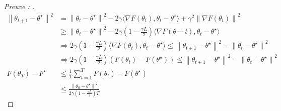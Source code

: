 \begin{proof}[Preuve : ]
    \begin{align*}
        \left\| \theta _{t+1} - \theta ^\star  \right\| ^2 
            &= \left\| \theta _t - \theta ^\star  \right\| ^2 - 2 \gamma  \langle \nabla F(\theta _t), \theta _t - \theta ^\star \rangle + \gamma  ^2 \left\| \nabla F(\theta _t) \right\| ^2 \\
            &\geq  \left\| \theta _t - \theta ^\star  \right\| ^2 - 2 \gamma ( 1 - \frac{\gamma L }{2}) \langle \nabla F(\theta -t) , \theta _t - \theta ^\star \rangle  \\
            &\Rightarrow 2 \gamma (1 - \frac{\gamma L}{2}) \langle \nabla F(\theta _t) , \theta _t - \theta ^\star \rangle \leq  \left\| \theta _{t+1} - \theta ^\star  \right\| ^2 - \left\| \theta _t - \theta ^\star  \right\| ^2  \\
            &\Rightarrow 2 \gamma (1 - \frac{\gamma L }{2}) (F(\theta _t) - F(\theta ^\star )) \leq  \left\| \theta _{t+1} - \theta ^\star  \right\| ^2 - \left\| \theta _t - \theta ^\star  \right\| ^2  \\
        F(\theta _T) - F^\star 
            &\leq \frac{1}{T}\sum_{t=1}^{T} F(\theta _t) - F(\theta ^\star ) \\
            &\leq \frac{\left\| \theta _0 - \theta ^\star  \right\| ^2}{ 2 \gamma (1 - \frac{\gamma L}{2}) T}
    \end{align*}
    
\end{proof}
